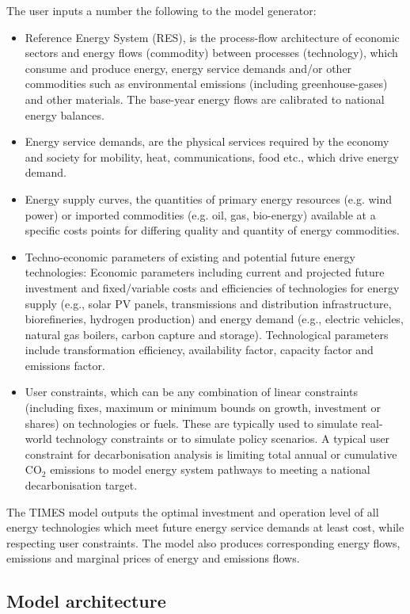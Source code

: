 \documentclass[journal abbreviation, manuscript]{copernicus}
\begin{document}
The user inputs a number the following to the model generator:
\begin{itemize}
 \item Reference Energy System (RES), is the process-flow architecture of economic sectors and energy flows (commodity) between processes (technology), which consume and produce energy, energy service demands and/or other commodities such as environmental emissions (including greenhouse-gases) and other materials. The base-year energy flows are calibrated to national energy balances.
 \item Energy service demands, are the physical services required by the economy and society for mobility, heat, communications, food etc., which drive energy demand. 
 \item Energy supply curves, the quantities of primary energy resources (e.g. wind power) or imported commodities (e.g. oil, gas, bio-energy) available at a specific costs points for differing quality and quantity of energy commodities.
 \item Techno-economic parameters of existing and potential future energy technologies: Economic parameters including current and projected future investment and fixed/variable costs and efficiencies of technologies for energy supply (e.g., solar PV panels, transmissions and distribution infrastructure, biorefineries, hydrogen production) and energy demand (e.g., electric vehicles, natural gas boilers, carbon capture and storage). Technological parameters include transformation efficiency, availability factor, capacity factor and emissions factor. 
 \item User constraints, which can be any combination of linear constraints (including fixes, maximum or minimum bounds on growth, investment or shares) on technologies or fuels. These are typically used to simulate real-world technology constraints or to simulate policy scenarios. A typical user constraint for decarbonisation analysis is limiting total annual or cumulative CO$_2$ emissions to model energy system pathways to meeting a national decarbonisation target.
\end{itemize} 

The TIMES model outputs the optimal investment and operation level of all energy technologies which meet future energy service demands at least cost, while respecting user constraints. The model also produces corresponding energy flows, emissions and marginal prices of energy and emissions flows. 

\subsection{Model architecture}
\label{ss:system_overview}
\end{document}
